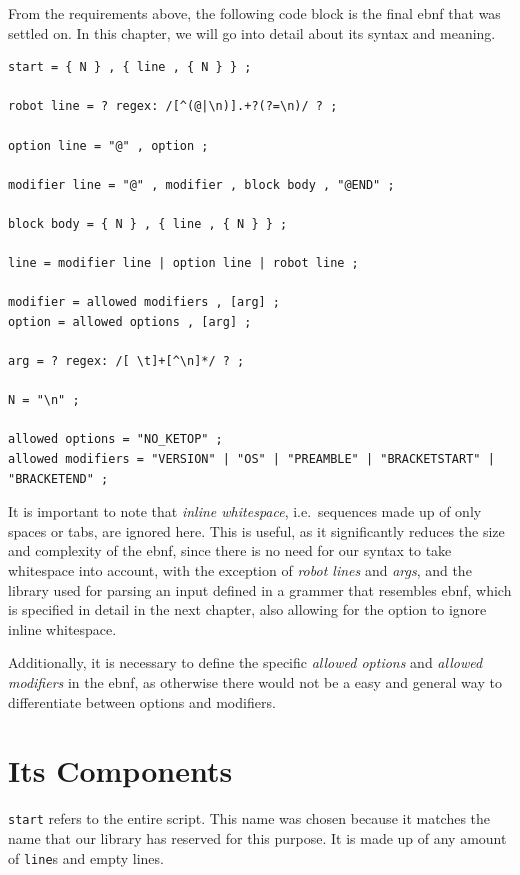 
From the requirements above, the following code block is the final \gls{ebnf} that was settled on. In this chapter, we will go into detail about its syntax and meaning. 

\begin{lstlisting}[caption={The complete final EBNF that we developed.}, label={lst:our_ebnf}]
start = { N } , { line , { N } } ;

robot line = ? regex: /[^(@|\n)].+?(?=\n)/ ? ;

option line = "@" , option ;

modifier line = "@" , modifier , block body , "@END" ;

block body = { N } , { line , { N } } ;

line = modifier line | option line | robot line ;

modifier = allowed modifiers , [arg] ;
option = allowed options , [arg] ;

arg = ? regex: /[ \t]+[^\n]*/ ? ;

N = "\n" ;

allowed options = "NO_KETOP" ;
allowed modifiers = "VERSION" | "OS" | "PREAMBLE" | "BRACKETSTART" | "BRACKETEND" ;
\end{lstlisting}

It is important to note that \textit{inline whitespace}, i.e.\ sequences made up of only spaces or tabs, are ignored here. This is useful, as it significantly reduces the size and complexity of the \gls{ebnf}, since there is no need for our syntax to take whitespace into account, with the exception of \textit{robot lines} and \textit{args}, and the library used for parsing an input defined in a grammer that resembles \gls{ebnf}, which is specified in detail in the next chapter, also allowing for the option to ignore inline whitespace. 

Additionally, it is necessary to define the specific \textit{allowed options} and \textit{allowed modifiers} in the \gls{ebnf}, as otherwise there would not be a easy and general way to differentiate between options and modifiers. 

\section{Its Components}

\verb|start| refers to the entire script. This name was chosen because it matches the name that our library has reserved for this purpose. It is made up of any amount of \verb|line|s and empty lines. 

